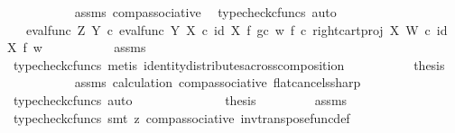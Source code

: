 \begin{isabellebody}
\ \ \ \ \ \ \ \ \ \isamarkupfalse%
\ assms\ comp{\isacharunderscore}{\kern0pt}associative{}\ \isamarkupfalse%
\ {\isacharparenleft}{\kern0pt}typecheck{\isacharunderscore}{\kern0pt}cfuncs{\isacharcomma}{\kern0pt}\ auto{\isacharparenright}{\kern0pt}\isanewline
\ \ \ \ \ \ \ \isamarkupfalse%
\ \isamarkupfalse%
\ {\isachardoublequoteopen}{\isachardot}{\kern0pt}{\isachardot}{\kern0pt}{\isachardot}{\kern0pt}\ {\isacharequal}{\kern0pt}\ eval{\isacharunderscore}{\kern0pt}func\ Z\ Y\ {\isasymcirc}\isactrlsub c\ {\isasymlangle}eval{\isacharunderscore}{\kern0pt}func\ Y\ X\ {\isasymcirc}\isactrlsub c\ {\isacharparenleft}{\kern0pt}id\ X\ {\isasymtimes}\isactrlsub f\ {\isacharparenleft}{\kern0pt}g{\isasymcirc}\isactrlsub c\ w{\isacharparenright}{\kern0pt}{\isacharparenright}{\kern0pt}{\isacharcomma}{\kern0pt}\ f\ {\isasymcirc}\isactrlsub c\ right{\isacharunderscore}{\kern0pt}cart{\isacharunderscore}{\kern0pt}proj\ X\ W\ {\isasymcirc}\isactrlsub c\ {\isacharparenleft}{\kern0pt}id\ X\ {\isasymtimes}\isactrlsub f\ w{\isacharparenright}{\kern0pt}{\isasymrangle}{\isachardoublequoteclose}\isanewline
\ \ \ \ \ \ \ \ \ \isamarkupfalse%
\ assms\ \isamarkupfalse%
\ {\isacharparenleft}{\kern0pt}typecheck{\isacharunderscore}{\kern0pt}cfuncs{\isacharcomma}{\kern0pt}\ metis\ identity{\isacharunderscore}{\kern0pt}distributes{\isacharunderscore}{\kern0pt}across{\isacharunderscore}{\kern0pt}composition{\isacharparenright}{\kern0pt}\isanewline
\ \ \ \ \ \ \ \isamarkupfalse%
\ \isamarkupfalse%
\ {\isacharquery}{\kern0pt}thesis\isanewline
\ \ \ \ \ \ \ \ \ \isamarkupfalse%
\ assms\ calculation\ comp{\isacharunderscore}{\kern0pt}associative{}\ flat{\isacharunderscore}{\kern0pt}cancels{\isacharunderscore}{\kern0pt}sharp\ \isamarkupfalse%
\ {\isacharparenleft}{\kern0pt}typecheck{\isacharunderscore}{\kern0pt}cfuncs{\isacharcomma}{\kern0pt}\ auto{\isacharparenright}{\kern0pt}\isanewline
\ \ \ \ \ \isamarkupfalse%
\isanewline
\ \ \ \ \ \isamarkupfalse%
\ \isamarkupfalse%
\ {\isacharquery}{\kern0pt}thesis\isanewline
\ \ \ \ \ \ \ \isamarkupfalse%
\ assms\ \isamarkupfalse%
\ {\isacharparenleft}{\kern0pt}typecheck{\isacharunderscore}{\kern0pt}cfuncs{\isacharcomma}{\kern0pt}\ smt\ {\isacharparenleft}{\kern0pt}z{}{\isacharparenright}{\kern0pt}\ comp{\isacharunderscore}{\kern0pt}associative{}\ inv{\isacharunderscore}{\kern0pt}transpose{\isacharunderscore}{\kern0pt}func{\isacharunderscore}{\kern0pt}def{}\ \isanewline

\end{isabellebody}

